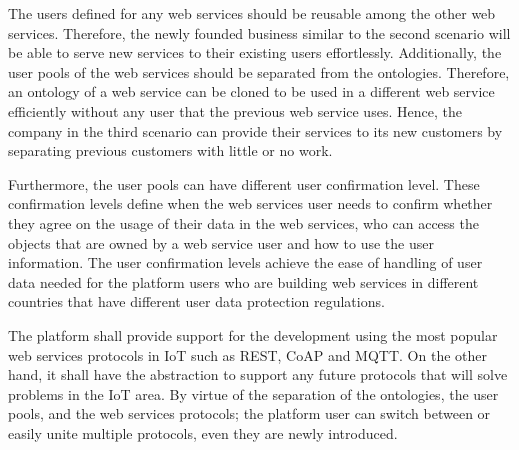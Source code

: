 The users defined for any web services should be reusable among the other web services. Therefore, the newly founded business similar to the second scenario will be able to serve new services to their existing users effortlessly. Additionally, the user pools of the web services should be separated from the ontologies. Therefore, an ontology of a web service can be cloned to be used in a different web service efficiently without any user that the previous web service uses. Hence, the company in the third scenario can provide their services to its new customers by separating previous customers with little or no work.

Furthermore, the user pools can have different user confirmation level. These confirmation levels define when the web services user needs to confirm whether they agree on the usage of their data in the web services, who can access the objects that are owned by a web service user and how to use the user information. The user confirmation levels achieve the ease of handling of user data needed for the platform users who are building web services in different countries that have different user data protection regulations.

The platform shall provide support for the development using the most popular web services protocols in IoT such as REST, CoAP and MQTT. On the other hand, it shall have the abstraction to support any future protocols that will solve problems in the IoT area. By virtue of the separation of the ontologies, the user pools, and the web services protocols; the platform user can switch between or easily unite multiple protocols, even they are newly introduced.

